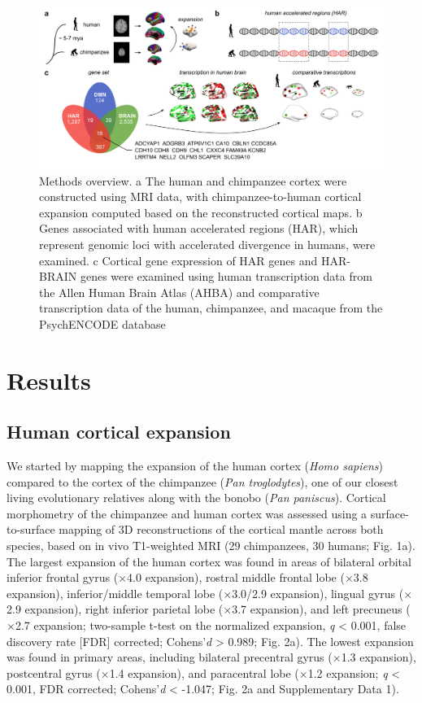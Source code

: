 \begin{refsection}
\begin{figure}[h]
    \centering
    \includegraphics[width=\linewidth]{images/harFig1.png}
    \caption{Methods overview. a The human and chimpanzee cortex were constructed using MRI data, with chimpanzee-to-human cortical expansion computed based on the reconstructed cortical maps. b Genes associated with human accelerated regions (HAR), which represent genomic loci with accelerated divergence in humans, were examined. c Cortical gene expression of HAR genes and HAR-BRAIN genes were examined using human transcription data from the Allen Human Brain Atlas (AHBA) and comparative transcription data of the human, chimpanzee, and macaque from the PsychENCODE database}
    \label{harFig1}
\end{figure}

\section*{Results}
\subsection*{Human cortical expansion}
We started by mapping the expansion of the human cortex (\textit{Homo sapiens}) compared to the cortex of the chimpanzee (\textit{Pan troglodytes}), one of our closest living evolutionary relatives along with the bonobo (\textit{Pan paniscus}). Cortical morphometry of the chimpanzee and human cortex was assessed using a surface-to-surface mapping of 3D reconstructions of the cortical mantle across both species, based on in vivo T1-weighted MRI (29 chimpanzees, 30 humans; Fig. 1a). The largest expansion of the human cortex was found in areas of bilateral orbital inferior frontal gyrus ($\times$4.0 expansion), rostral middle frontal lobe ($\times$3.8 expansion), inferior/middle temporal lobe ($\times$3.0/2.9 expansion), lingual gyrus ($\times$2.9 expansion), right inferior parietal lobe ($\times$3.7 expansion), and left precuneus ($\times$2.7 expansion; two-sample t-test on the normalized expansion, \textit{q} < 0.001, false discovery rate [FDR] corrected; Cohens'\textit{d} > 0.989; Fig. 2a). The lowest expansion was found in primary areas, including bilateral precentral gyrus ($\times$1.3 expansion), postcentral gyrus ($\times$1.4 expansion), and paracentral lobe ($\times$1.2 expansion; \textit{q} < 0.001, FDR corrected; Cohens'\textit{d} < -1.047; Fig. 2a and Supplementary Data 1).


\end{refsection}

